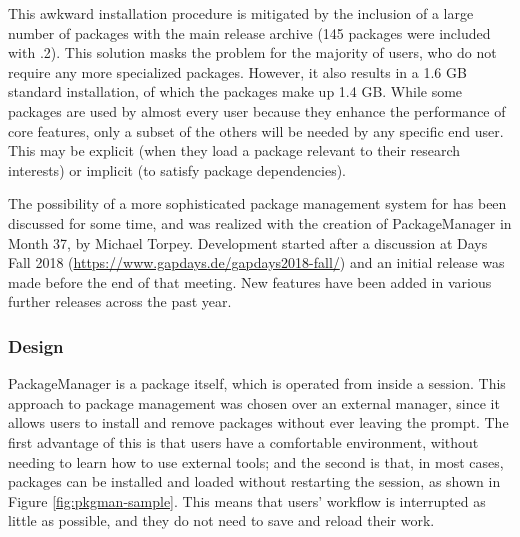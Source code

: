 This awkward installation procedure is mitigated by the inclusion of a large
number of packages with the main release archive (145 packages were included
with .2).  This solution masks the problem for the majority of users,
who do not require any more specialized packages.  However, it also results in a
1.6 GB standard installation, of which the packages make up 1.4 GB.  
While some packages are used by almost every \GAP user because they
enhance the performance of core \GAP features, 
only a subset of the others will be needed by any specific end
user. This may be explicit (when they load a package relevant to their
research interests) or implicit (to satisfy package dependencies).

The possibility of a more sophisticated package management system for \GAP has
been discussed for some time, and was realized with the creation of {\sf
  PackageManager} \cite{PackageManager} in
Month 37, by Michael Torpey.  Development started after a discussion at
\GAP Days Fall 2018 (\url{https://www.gapdays.de/gapdays2018-fall/}) and an
initial release was made before the end of that meeting.  New features have been
added in various further releases across the past year.


\subsubsection{Design}

{\sf PackageManager} is a \GAP package itself, which is operated from inside a
\GAP session.  This approach to package management was chosen over an external
manager, since it allows users to install and remove packages without ever
leaving the \GAP prompt.  The first advantage of this is that
users have a comfortable environment, without needing to learn how to use
external tools; and the second is that, in most cases, packages can be installed
and loaded without restarting the session, as shown in Figure \ref{fig:pkgman-sample}.
This means that users' workflow is interrupted as little as possible, and they do
not need to save and reload their work.

